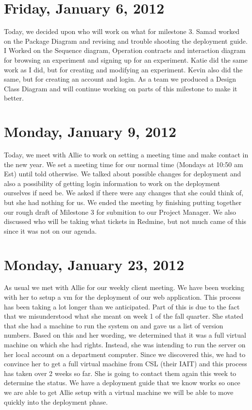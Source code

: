 \documentclass{article}
\begin{document}
\section{Friday, January 6, 2012} %
Today, we decided upon who will work on what for milestone 3. Samad worked on the Package Diagram
and revising and trouble shooting the deployment guide.  I Worked on  the Sequence diagram, Operation
contracts and interaction diagram for browsing an experiment and signing up for an experiment.  Katie
did the same work as I did, but for creating and modifying an experiment.  Kevin also did the same, but for 
creating an account and login.  As a team we produced a Design Class Diagram and will continue working
on parts of this milestone to make it better.

\section{Monday, January 9, 2012} %
Today, we meet with Allie to work on setting a meeting time and make contact in the new year.  We set a
meeting time for our normal time (Mondays at 10:50 am Est) until told otherwise.  We talked about
possible changes for deployment and also a possibility of getting login information to work on the deployment
ourselves if need be.  We asked if there were any changes that she could think of, but she had nothing for us.
We ended the meeting by finishing putting together our rough draft of Milestone 3 for submition to our Project
Manager.  We also discussed who will be taking what tickets in Redmine, but not much came of this since it was 
not on our agenda.

\section{Monday, January 23, 2012} %
As usual we met with Allie for our weekly client meeting. We have been working with her to setup a vm for the
deployment of our web application. This process has been taking a lot longer than we anticipated. Part of this 
is due to the fact that we misunderstood what she meant on week 1 of the fall quarter. She stated that she had
a machine to run the system on and gave us a list of version numbers. Based on this and her wording, we 
determined that it was a full virtual machine on which she had rights. Instead, she was intending to run the 
server on her local account on a department computer. Since we discovered this, we had to convince her to get a
full virtual machine from CSL (their IAIT) and this process has taken over 2 weeks so far. She is going to 
contact them again this week to determine the status. We have a deployment guide that we know works so once we 
are able to get Allie setup with a virtual machine we will be able to move quickly into the deployment phase.
\end{document}
